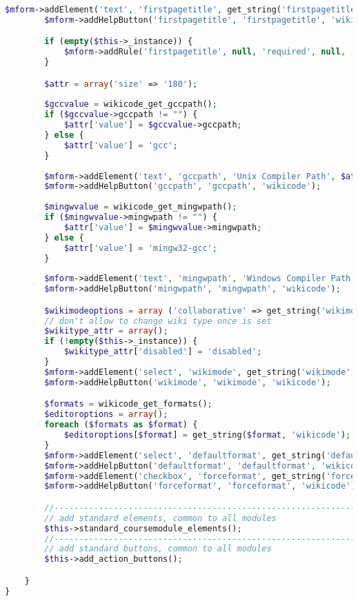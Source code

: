 \begin{lstlisting}[language=PHP]
        $mform->addElement('text', 'firstpagetitle', get_string('firstpagetitle', 'wikicode'), $attr);
        $mform->addHelpButton('firstpagetitle', 'firstpagetitle', 'wikicode');

        if (empty($this->_instance)) {
            $mform->addRule('firstpagetitle', null, 'required', null, 'client');
        }

		$attr = array('size' => '180');
		
		$gccvalue = wikicode_get_gccpath();
		if ($gccvalue->gccpath != "") {
		    $attr['value'] = $gccvalue->gccpath;
		} else {
			$attr['value'] = 'gcc';
		}
		
		$mform->addElement('text', 'gccpath', 'Unix Compiler Path', $attr);
		$mform->addHelpButton('gccpath', 'gccpath', 'wikicode');
		
		$mingwvalue = wikicode_get_mingwpath();
		if ($mingwvalue->mingwpath != "") {
		    $attr['value'] = $mingwvalue->mingwpath;
		} else {
			$attr['value'] = 'mingw32-gcc';
		}
		
		$mform->addElement('text', 'mingwpath', 'Windows Compiler Path', $attr);
		$mform->addHelpButton('mingwpath', 'mingwpath', 'wikicode');

        $wikimodeoptions = array ('collaborative' => get_string('wikimodecollaborative', 'wikicode'), 'individual' => get_string('wikimodeindividual', 'wikicode'));
        // don't allow to change wiki type once is set
        $wikitype_attr = array();
        if (!empty($this->_instance)) {
            $wikitype_attr['disabled'] = 'disabled';
        }
        $mform->addElement('select', 'wikimode', get_string('wikimode', 'wikicode'), $wikimodeoptions, $wikitype_attr);
        $mform->addHelpButton('wikimode', 'wikimode', 'wikicode');

        $formats = wikicode_get_formats();
        $editoroptions = array();
        foreach ($formats as $format) {
            $editoroptions[$format] = get_string($format, 'wikicode');
        }
        $mform->addElement('select', 'defaultformat', get_string('defaultformat', 'wikicode'), $editoroptions);
        $mform->addHelpButton('defaultformat', 'defaultformat', 'wikicode');
        $mform->addElement('checkbox', 'forceformat', get_string('forceformat', 'wikicode'));
        $mform->addHelpButton('forceformat', 'forceformat', 'wikicode');

        //-------------------------------------------------------------------------------
        // add standard elements, common to all modules
        $this->standard_coursemodule_elements();
        //-------------------------------------------------------------------------------
        // add standard buttons, common to all modules
        $this->add_action_buttons();

    }
}
\end{lstlisting}

